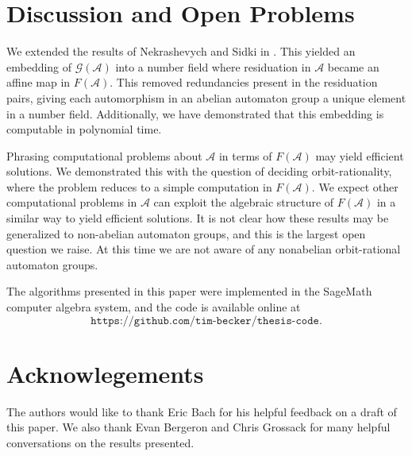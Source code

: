 \documentclass[12pt, letterpaper]{article}
\newcommand{\A}{\mathcal A}
\newcommand{\gp}{\mathcal G}
\newcommand{\codeurl}{\texttt{https://github.com/tim-becker/thesis-code}}
\begin{document}
\section{Discussion and Open Problems}

We extended the results of Nekrashevych and Sidki in
\cite{nekrashevych2004automorphisms}.  This yielded an embedding of $\gp(\A)$
into a number field where residuation in $\A$ became an affine map in $F(\A)$.
This removed redundancies present in the residuation pairs, giving each
automorphism in an abelian automaton group a unique element in a number field.
Additionally, we have demonstrated that this embedding is computable in
polynomial time.

Phrasing computational problems about $\A$ in terms of $F(\A)$ may yield
efficient solutions. We demonstrated this with the question of deciding
orbit-rationality, where the problem reduces to a simple computation in
$F(\A)$. We expect other computational problems in $\A$ can exploit the
algebraic structure of $F(\A)$ in a similar way to yield efficient solutions.
It is not clear how these results may be generalized to non-abelian automaton
groups, and this is the largest open question we raise. At this time we are
not aware of any nonabelian orbit-rational automaton groups.

The algorithms presented in this paper were implemented in the SageMath
computer algebra system, and the code is available online at
\[
    \codeurl.
\]

\section{Acknowlegements}
The authors would like to thank Eric Bach for his helpful feedback on a draft
of this paper. We also thank Evan Bergeron and Chris Grossack for many helpful
conversations on the results presented.

\printbibliography
\end{document}
